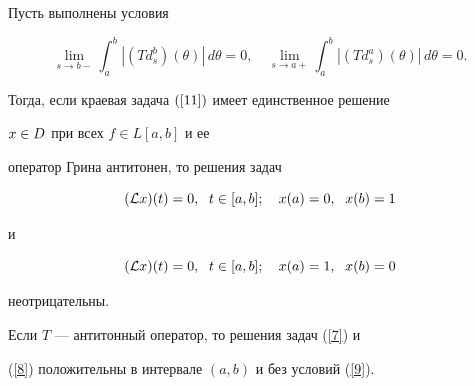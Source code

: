 \begin{thms}\label{t2}


Пусть выполнены условия


\begin{equation}\label{9}


\lim_{s\to b-}


\int_a^b\left|(Td^b_s)(\theta)\right|\,d\theta=0,


\quad


\lim_{s\to a+}


\int_a^b\left|(Td^a_s)(\theta)\right|\,d\theta=0.


\end{equation}


Тогда, если краевая задача $(\ref{11})$ имеет единственное решение


$x\in D$ при всех $f\in L[a,b]$ и ее


оператор Грина антитонен, то решения задач


\begin{equation}\label{7}


(\L x)(t)=0,\ \; t\in[a,b];\quad


x(a)=0,\ \; x(b)=1


\end{equation}


и


\begin{equation}\label{8}


(\L x)(t)=0,\ \; t\in[a,b];\quad


x(a)=1,\ \; x(b)=0


\end{equation}


неотрицательны.


\end{thms}





\begin{notes}


Если $T$ --- антитонный оператор, то решения задач (\ref{7}) и


(\ref{8}) положительны в интервале $(a,b)$ и без условий (\ref{9}).


\end{notes}





